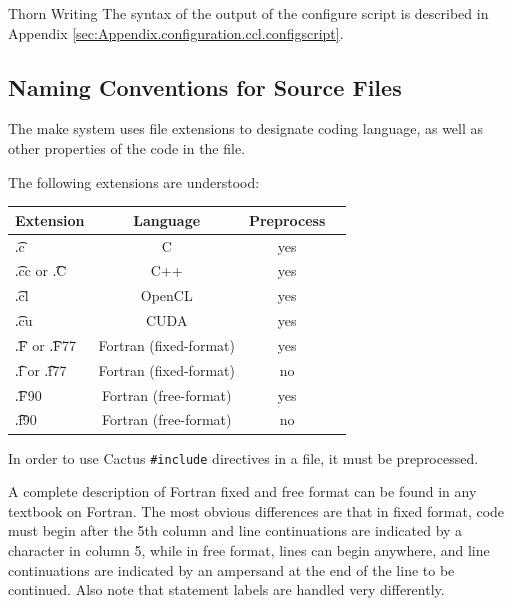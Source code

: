 \begin{cactuspart}{Thorn Writing}
The syntax of the output of the configure script is described in
Appendix \ref{sec:Appendix.configuration.ccl.configscript}.



\subsection{Naming Conventions for Source Files}
\label{nacofosofi}

The make system uses file extensions to designate coding language,
as well as other properties of the code in the file.

The following extensions are understood:

\begin{center}
\begin{tabular}{|l|c|c|c|}
\hline
Extension            & Language               &  Preprocess \\
\hline
{\t .c}              & C                      & yes \\
{\t .cc} or {\t .C}  & C++                    & yes \\
{\t .cl}             & OpenCL                 & yes \\
{\t .cu}             & CUDA                   & yes \\
{\t .F} or {\t .F77} & Fortran (fixed-format) & yes \\
{\t .f} or {\t .f77} & Fortran (fixed-format) & no  \\
{\t .F90}            & Fortran (free-format)  & yes \\
{\t .f90}            & Fortran (free-format)  & no  \\
\hline
\end{tabular}
\end{center}

In order to use Cactus \texttt{\#include} directives in a file, it must be
preprocessed.

A complete description of Fortran fixed and free format can be found in any
textbook on Fortran.  The most obvious differences are that in fixed
format, code must begin after the 5th column and line continuations are
indicated by a character in column 5, while in free format, lines can begin
anywhere, and line continuations are indicated by an ampersand at the end of
the line to be continued.  Also note that statement labels are handled
very differently.


\end{cactuspart}

